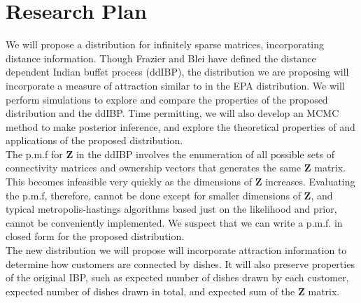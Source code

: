 \chapter{Research Plan}%

We will propose a distribution for infinitely sparse matrices, incorporating
distance information. Though Frazier and Blei have defined the distance
dependent Indian buffet process (ddIBP), the distribution we are proposing will
incorporate a measure of attraction similar to in the EPA distribution. We will
perform simulations to explore and compare the properties of the proposed
distribution and the ddIBP. Time permitting, we will also develop an MCMC
method to make posterior inference, and explore the theoretical properties of
and applications of the proposed distribution. \\

\noindent
The p.m.f for $\bm Z$ in the ddIBP involves the enumeration of all possible sets
of connectivity matrices and ownership vectors that generates the same $\bm Z$ 
matrix. This becomes infeasible very quickly as the dimensions of $\bm Z$ 
increases. Evaluating the p.m.f, therefore, cannot be done except for smaller
dimensions of $\bm Z$, and typical metropolis-hastings algorithms based just on 
the likelihood and prior, cannot be conveniently implemented. We suspect that
we can write a p.m.f. in closed form for the proposed distribution.\\

\noindent
The new distribution we will propose will incorporate attraction information to
determine how customers are connected by dishes. It will also preserve properties 
of the original IBP, such as expected number of dishes drawn by each customer,
expected number of dishes drawn in total, and expected sum of the $\bm Z$ matrix.

